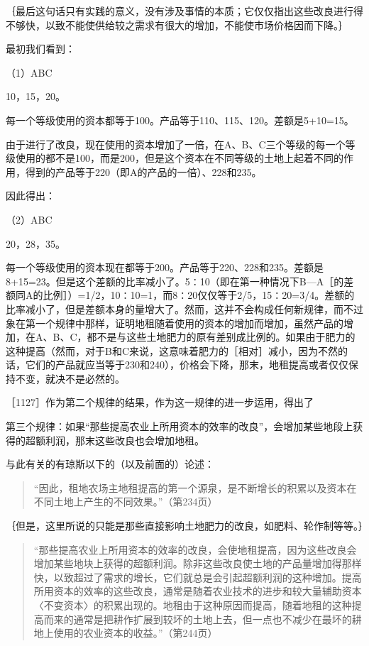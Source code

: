 ｛最后这句话只有实践的意义，没有涉及事情的本质；它仅仅指出这些改良进行得不够快，以致不能使供给较之需求有很大的增加，不能使市场价格因而下降。｝

最初我们看到：

（1）ABC

10，15，20。

每一个等级使用的资本都等于100。产品等于110、115、120。差额是5+10=15。

由于进行了改良，现在使用的资本增加了一倍，在A、B、C三个等级的每一个等级使用的都不是100，而是200，但是这个资本在不同等级的土地上起着不同的作用，得到的产品等于220（即A的产品的一倍）、228和235。

因此得出：

（2）ABC

20，28，35。

每一个等级使用的资本现在都等于200。产品等于220、228和235。差额是8+15=23。但是这个差额的比率减小了。5∶10（即在第一种情况下B—A［的差额同A的比例］）=1/2，10∶10=1，而8∶20仅仅等于2/5，15∶20=3/4。差额的比率减小了，但是差额本身的量增大了。然而，这并不会构成任何新规律，而不过象在第一个规律中那样，证明地租随着使用的资本的增加而增加，虽然产品的增加，在A、B、C，都不是与这些土地肥力的原有差别成比例的。如果由于肥力的这种提高（然而，对于B和C来说，这意味着肥力的［相对］减小，因为不然的话，它们的产品就应当等于230和240），价格会下降，那末，地租提高或者仅仅保持不变，就决不是必然的。

［1127］作为第二个规律的结果，作为这一规律的进一步运用，得出了

第三个规律：如果“那些提高农业上所用资本的效率的改良”，会增加某些地段上获得的超额利润，那末这些改良也会增加地租。

与此有关的有琼斯以下的（以及前面的）论述：

\begin{quote}{“因此，租地农场主地租提高的第一个源泉，是不断增长的积累以及资本在不同土地上产生的不同效果。”（第234页）}\end{quote}

｛但是，这里所说的只能是那些直接影响土地肥力的改良，如肥料、轮作制等等。｝

\begin{quote}{“那些提高农业上所用资本的效率的改良，会使地租提高，因为这些改良会增加某些地块上获得的超额利润。除非这些改良使土地的产品量增加得那样快，以致超过了需求的增长，它们就总是会引起超额利润的这种增加。提高所用资本的效率的这些改良，通常是随着农业技术的进步和较大量辅助资本〈不变资本〉的积累出现的。地租由于这种原因而提高，随着地租的这种提高而来的通常是把耕作扩展到较坏的土地上去，但一点也不减少在最坏的耕地上使用的农业资本的收益。”（第244页）}\end{quote}

